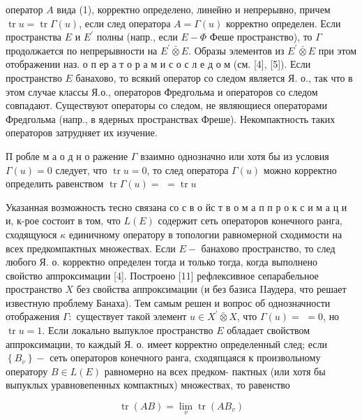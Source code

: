 \documentclass[10pt]{article}
\begin{document}
оператор $A$ вида (1), корректно определено, линейно и непрерывно, причем $\operatorname{tr} u=\operatorname{tr} \Gamma(u)$, если след оператора $A=\Gamma(u)$ корректно определен. Если пространства $E$ и $E^{\prime}$ полны (напр., если $E-\Phi$ Феше пространство), то $\Gamma$ продолжается по непрерывности на $E^{\prime} \bar{\otimes} E$. Образы элементов из $E^{\prime} \bar{\otimes} E$ при этом отображении наз. о п ер а т о р а м и с о с л е д о м (см. [4], [5]). Если пространство $E$ банахово, то всякий оператор со следом является Я. о., так что в этом случае классы Я.о., операторов Фредгольма и операторов со следом совпадают. Существуют операторы со следом, не являющиеся операторами Фредгольма (напр., в ядерных пространствах Фреше). Некомпактность таких операторов затрудняет их изучение.



П робле м а о д н о ражение $\Gamma$ взаимно однозначно или хотя бы из условия $\Gamma(u)=0$ следует, что $\operatorname{tr} u=0$, то след оператора $\Gamma(u)$ можно корректно определить равенством $\operatorname{tr} \Gamma(u)=$ $=\operatorname{tr} u$



Указанная возможность тесно связана со с в о йс т в о м а п п р о к с и м а ц и и, к-рое состоит в том, что $L(E)$ содержит сеть операторов конечного ранга, сходящуюся $\kappa$ единичному оператору в топологии равномерной сходимости на всех предкомпактных множествах. Если $E-$ банахово пространство, то след любого Я. о. корректно определен тогда и только тогда, когда выполнено свойство аппроксимации [4]. Построено [11] рефлексивное сепарабельное пространство $X$ без свойства аппроксимации (и без базиса IIаудера, что решает известную проблему Банаха). Тем самым решен и вопрос об однозначности отображения $\Gamma:$ существует такой элемент $u \in X^{\prime} \bar{\otimes} X$, что $\Gamma(u)=$ $=0$, но $\operatorname{tr} u=1$. Если локально выпуклое пространство $E$ обладает свойством аппроксимации, то каждый Я. о. имеет корректно определенный след; если $\left\{B_{v}\right\}-$ сеть операторов конечного ранга, сходяпцаяся к произвольному оператору $B \in L(E)$ равномерно на всех предком- пактных (или хотя бы выпуклых уравновепенных компактных) множествах, то равенство



\[

\operatorname{tr}(A B)=\lim _{v} \operatorname{tr}\left(A B_{v}\right)

\]
\end{document}
